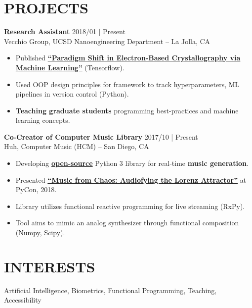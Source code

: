 \documentclass[line,mm]{res}
\begin{document}
\section{PROJECTS}
{\bf Research Assistant } \hfill            2018/01 | Present \\
  Vecchio Group, UCSD Nanoengineering Department -- La Jolla, CA
  \begin{itemize}  \itemsep -2pt %
     \item Published \href{https://arxiv.org/ftp/arxiv/papers/1902/1902.03682.pdf}{{\bf ``Paradigm Shift in Electron-Based Crystallography via Machine Learning''}} (Tensorflow). 
     \item Used OOP design principles for framework to track hyperparameters, ML pipelines in version control (Python).
     \item {\bf Teaching graduate students} programming best-practices and machine learning concepts.  
  \end{itemize} 


{\bf Co-Creator of Computer Music Library} \hfill 	 2017/10 | Present  \\
  Huh, Computer Music (HCM) -- San Diego, CA
  \begin{itemize}  \itemsep -2pt %
    \item Developing \href{https://github.com/alxrsngrtn/huh-computer-music}{{\bf open-source}} Python 3 library for real-time {\bf music generation}.  
    \item Presented {\bf \href{https://youtu.be/bTAFl8P2DkE?t=28m47s}{``Music from Chaos: Audiofying the Lorenz Attractor''}} at PyCon, 2018.
    \item Library utilizes functional reactive programming for live streaming (RxPy).
    \item Tool aims to mimic an analog synthesizer through functional composition (Numpy, Scipy).
  \end{itemize}

\section{INTERESTS}
Artificial Intelligence, Biometrics, Functional Programming, Teaching, Accessibility
                 
\end{document}
